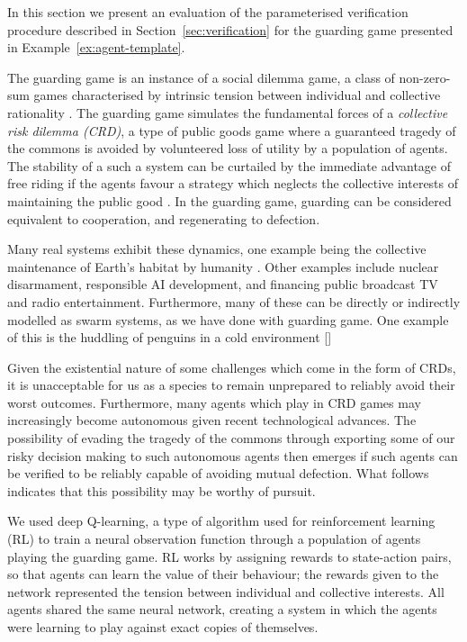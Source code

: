
In this section we present an evaluation of the parameterised verification
procedure described in Section~\ref{sec:verification} for the guarding game
presented in Example~\ref{ex:agent-template}.



The guarding game is an instance of a social dilemma game, a class of
non-zero-sum games characterised by intrinsic tension between individual and
collective rationality \cite{VanlangeJPV13}. The guarding game simulates the
fundamental forces of a \emph{collective risk dilemma (CRD)}, a type of public
goods game where a guaranteed tragedy of the commons \cite{Hardin68} is avoided
by volunteered loss of utility by a population of agents. The stability of a
such a system can be curtailed by the immediate advantage of free riding if the
agents favour a strategy which neglects the collective interests of maintaining
the public good \cite{SantosP11}. In the guarding game, guarding can be
considered equivalent to cooperation, and regenerating to defection.

Many real systems exhibit these dynamics, one example being the collective
maintenance of Earth's habitat by humanity \cite{Smirnov19}. Other examples
include nuclear disarmament, responsible AI development, and financing public
broadcast TV and radio entertainment. Furthermore, many of these can be
directly or indirectly modelled as swarm systems, as we have done with guarding
game. One example of this is the huddling of penguins in a cold environment
[]

Given the existential nature of some challenges which come in the form of CRDs,
it is unacceptable for us as a species to remain unprepared to reliably avoid
their worst outcomes. Furthermore, many agents which play in CRD games may
increasingly become autonomous given recent technological advances. The
possibility of evading the tragedy of the commons through exporting some of our
risky decision making to such autonomous agents then emerges if such agents can
be verified to be reliably capable of avoiding mutual defection. What follows
indicates that this possibility may be worthy of pursuit.

We used deep Q-learning, a type of algorithm used for reinforcement learning (RL) to train a neural observation function through a population of agents playing the guarding game. RL works by assigning rewards to state-action pairs, so that agents can learn the value of their behaviour; the rewards given to the network represented the tension between individual and collective interests. All agents shared the same neural network, creating a system in which the agents were learning to play against exact copies of themselves. 

